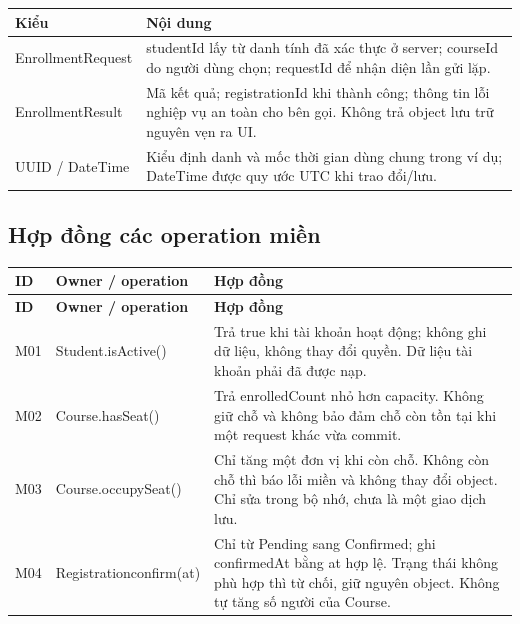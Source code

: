 \begin{center}\begin{tabularx}{\linewidth}{|L{39mm}|Y|}\hline
\textbf{Kiểu} & \textbf{Nội dung}\\\hline
EnrollmentRequest & studentId lấy từ danh tính đã xác thực ở server; courseId do người dùng chọn; requestId để nhận diện lần gửi lặp.\\\hline
EnrollmentResult & Mã kết quả; registrationId khi thành công; thông tin lỗi nghiệp vụ an toàn cho bên gọi. Không trả object lưu trữ nguyên vẹn ra UI.\\\hline
UUID / DateTime & Kiểu định danh và mốc thời gian dùng chung trong ví dụ; DateTime được quy ước UTC khi trao đổi/lưu.\\\hline
\end{tabularx}\end{center}

\clearpage
\subsection{Hợp đồng các operation miền}
\begin{longtable}{|L{15mm}|L{43mm}|L{82mm}|}\hline
\textbf{ID} & \textbf{Owner / operation} & \textbf{Hợp đồng}\\\hline
\endfirsthead
\hline
\textbf{ID} & \textbf{Owner / operation} & \textbf{Hợp đồng}\\\hline
\endhead
M01 & Student.isActive() & Trả true khi tài khoản hoạt động; không ghi dữ liệu, không thay đổi quyền. Dữ liệu tài khoản phải đã được nạp.\\\hline
M02 & Course.hasSeat() & Trả enrolledCount nhỏ hơn capacity. Không giữ chỗ và không bảo đảm chỗ còn tồn tại khi một request khác vừa commit.\\\hline
M03 & Course.occupySeat() & Chỉ tăng một đơn vị khi còn chỗ. Không còn chỗ thì báo lỗi miền và không thay đổi object. Chỉ sửa trong bộ nhớ, chưa là một giao dịch lưu.\\\hline
M04 & Registration\newline confirm(at) & Chỉ từ Pending sang Confirmed; ghi confirmedAt bằng at hợp lệ. Trạng thái không phù hợp thì từ chối, giữ nguyên object. Không tự tăng số người của Course.\\\hline
\end{longtable}

